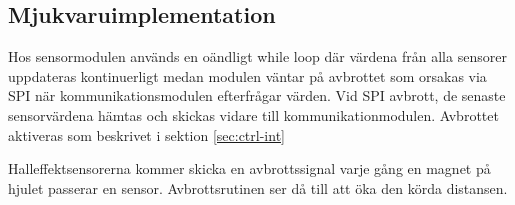 \documentclass[tekniskrapport/tech.tex]{subfiles}
\begin{document}
\subsection{Mjukvaruimplementation} 
Hos sensormodulen används en oändligt while loop där värdena från alla sensorer uppdateras kontinuerligt medan modulen väntar på avbrottet som orsakas via SPI när kommunikationsmodulen efterfrågar värden. Vid SPI avbrott, de senaste sensorvärdena hämtas och skickas vidare till kommunikationmodulen. Avbrottet aktiveras
som beskrivet i sektion \ref{sec:ctrl-int}

Halleffektsensorerna kommer skicka en avbrottssignal varje gång en magnet på
hjulet passerar en sensor. Avbrottsrutinen ser då till att öka den körda
distansen.
\end{document}
